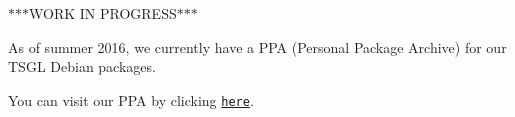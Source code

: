 $\ast$$\ast$$\ast$\-W\-O\-R\-K I\-N P\-R\-O\-G\-R\-E\-S\-S$\ast$$\ast$$\ast$

As of summer 2016, we currently have a P\-P\-A (Personal Package Archive) for our T\-S\-G\-L Debian packages.

You can visit our P\-P\-A by clicking \href{https://launchpad.net/~tsgl-test/+archive/ubuntu/tsgl-dev}{\tt here}. 